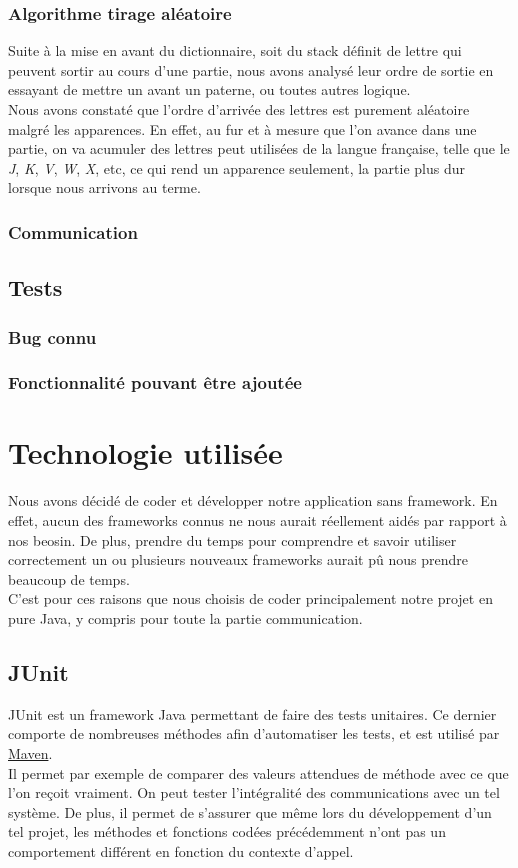 \documentclass[a4paper,12pt]{article}
\begin{document}
		\subsubsection{Algorithme tirage aléatoire}
		Suite à la mise en avant du dictionnaire, soit du stack définit de lettre qui peuvent sortir au cours d'une partie, nous avons analysé leur ordre de sortie en essayant de mettre un avant un paterne, ou toutes autres logique. \\
		Nous avons constaté que l'ordre d'arrivée des lettres est purement aléatoire malgré les apparences. En effet, au fur et à mesure que l'on avance dans une partie, on va acumuler des lettres peut utilisées de la langue française, telle que le \textit{J}, \textit{K}, \textit{V}, \textit{W}, \textit{X}, etc, ce qui rend un apparence seulement, la partie plus dur lorsque nous arrivons au terme.
		
		\subsubsection{Communication}
	
	\subsection{Tests}
	\subsubsection{Bug connu}
	
	\subsubsection{Fonctionnalité pouvant être ajoutée}
	
	\section{Technologie utilisée}
	Nous avons décidé de coder et développer notre application sans framework. En effet, aucun des frameworks connus ne nous aurait réellement aidés par rapport à nos beosin. De plus, prendre du temps pour comprendre et savoir utiliser correctement un ou plusieurs nouveaux frameworks aurait pû nous prendre beaucoup de temps. \\
	C'est pour ces raisons que nous choisis de coder principalement notre projet en pure Java, y compris pour toute la partie communication. 
	
		\subsection{JUnit}
		JUnit est un framework Java permettant de faire des tests unitaires. Ce dernier comporte de nombreuses méthodes afin d'automatiser les tests, et est utilisé par \hyperref[maven]{Maven}.\\
		Il permet par exemple de comparer des valeurs attendues de méthode avec ce que l'on reçoit vraiment. On peut tester l'intégralité des communications avec un tel système. De plus, il permet de s'assurer que même lors du développement d'un tel projet, les méthodes et fonctions codées précédemment n'ont pas un comportement différent en fonction du contexte d'appel. 
		
\end{document}
